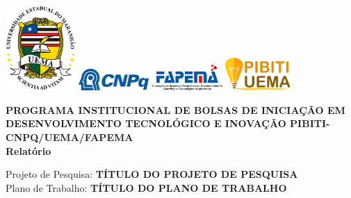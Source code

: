 \documentclass[a4paper, 12pt]{article}
\begin{document}

\begin{titlepage}
	\begin{center}
	   \begin{center}
    \includegraphics[width=0.2\textwidth]{imagens/UEMALOGO.png}
    \hfill
    \includegraphics[width=0.2\textwidth]{imagens/CNPQLOGO.png}
    \hfill
    \includegraphics[width=0.2\textwidth]{imagens/FAPEMALOGO.png}
    \hfill
    \includegraphics[width=0.2\textwidth]{imagens/PIBITILOGO.png}
\end{center}

        {\textbf{PROGRAMA INSTITUCIONAL DE BOLSAS DE INICIAÇÃO EM
DESENVOLVIMENTO TECNOLÓGICO E INOVAÇÃO
PIBITI-CNPQ/UEMA/FAPEMA}}\\
\vspace{15pt}
		{\textbf{Relatório }}\\ 
		\vspace{15pt}
        \vspace{95pt}
        \begin{flushleft}
                    Projeto de Pesquisa: \textbf{TÍTULO DO PROJETO DE PESQUISA}\\
                    \vspace{15pt}
                    Plano de Trabalho: \textbf{TÍTULO DO PLANO DE TRABALHO}
        \end{flushleft}
		\vspace{3,5cm}
	\end{center}
	

\end{titlepage}
\end{document}
